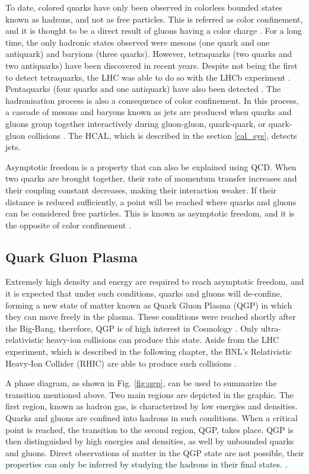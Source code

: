 To date, colored quarks have only been observed in colorless bounded states known as hadrons, and not as free particles. This is referred as color confinement, and it is thought to be a direct result of gluons having a color charge \cite{di2020measurement, thomson2013modern}. For a long time, the only hadronic states observed were mesons (one quark and one antiquark) and baryions (three quarks). However, tetraquarks (two quarks and two antiquarks) have been discovered in recent years. Despite not being the first to detect tetraquarks, the LHC was able to do so with the LHCb experiment \cite{aaij2021study}. Pentaquarks (four quarks and one antiquark) have also been detected \cite{aaij2015observation}. The hadronisation process is also a consequence of color confinement.  In this process, a cascade of mesons and baryons known as jets are produced when quarks and gluons group together interactively during gluon-gluon, quark-quark, or quark-gluon collisions \cite{baron2018desarrollo, di2020measurement}.  The HCAL, which is described in the section \ref{cal_sys}, detects jets.

Asymptotic freedom is a property that can also be explained using QCD. When two quarks are brought together, their rate of momentum transfer increases and their coupling constant decreases, making their interaction weaker. If their distance is reduced sufficiently, a point will be reached where quarks and gluons can be considered free particles. This is known as asymptotic freedom, and it is the opposite of color confinement \cite{danilov2020measurement, di2020measurement, sanchez2020search}. 

\subsection{Quark Gluon Plasma}
Extremely high density and energy are required to reach asymptotic freedom, and it is expected that under such conditions, quarks and gluons will de-confine, forming a new state of matter known as Quark Gluon Plasma (QGP) in which they can move freely in the plasma. These conditions were reached shortly after the Big-Bang, therefore, QGP is of high interest in Cosmology \cite{aziz2021z}. Only ultra-relativistic heavy-ion collisions can produce this state. Aside from the LHC experiment, which is described in the following chapter, the BNL's Relativistic Heavy-Ion Collider (RHIC) are able to produce such collisions \cite{villatorodetection}. 

A phase diagram, as shown in Fig. \ref{fig:qgp}, can be used to summarize the transition mentioned above. Two main regions are depicted in the graphic.  The first region, known as hadron gas, is characterized by low energies and densities. Quarks and gluons are confined into hadrons in such conditions. When a critical point is reached, the transition to the second region, QGP, takes place. QGP is then distinguished by high energies and densities, as well by unbounded quarks and gluons. Direct observations of matter in the QGP state are not possible, their properties can only be inferred by studying the hadrons in their final states. \cite{villatorodetection, parkkila2021quantifying}.


